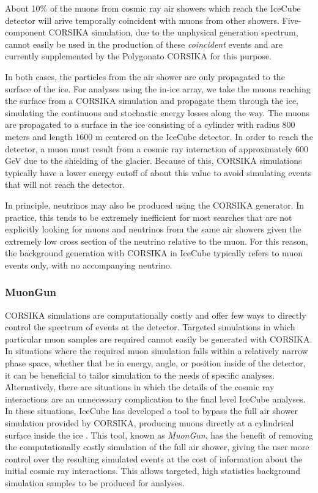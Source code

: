 About 10\% of the muons from cosmic ray air showers which reach the IceCube detector will arive temporally coincident with muons from other showers.
Five-component CORSIKA simulation, due to the unphysical generation spectrum, cannot easily be used in the production of these \emph{coincident} events and are currently supplemented by the Polygonato CORSIKA for this purpose.

In both cases, the particles from the air shower are only propagated to the surface of the ice. 
For analyses using the in-ice array, we take the muons reaching the surface from a CORSIKA simulation and propagate them through the ice, simulating the continuous and stochastic energy losses along the way. 
The muons are propagated to a surface in the ice consisting of a cylinder with radius 800 meters and length 1600 m centered on the IceCube detector.
In order to reach the detector, a muon must result from a cosmic ray interaction of approximately 600 GeV due to the shielding of the glacier.
Because of this, CORSIKA simulations typically have a lower energy cutoff of about this value to avoid simulating events that will not reach the detector.

In principle, neutrinos may also be produced using the CORSIKA generator. 
In practice, this tends to be extremely inefficient for most searches that are not explicitly looking for muons and neutrinos from the same air showers given the extremely low cross section of the neutrino relative to the muon.
For this reason, the background generation with CORSIKA in IceCube typically refers to muon events only, with no accompanying neutrino.

\subsubsection{MuonGun}
\label{subsubsec:muongun}
CORSIKA simulations are computationally costly and offer few ways to directly control the spectrum of events at the detector.
Targeted simulations in which particular muon samples are required cannot easily be generated with CORSIKA.
In situations where the required muon simulation falls within a relatively narrow phase space, whether that be in energy, angle, or position inside of the detector, it can be beneficial to tailor simulation to the needs of specific analyses.
Alternatively, there are situations in which the details of the cosmic ray interactions are an unnecessary complication to the final level IceCube analyses.
In these situations, IceCube has developed a tool to bypass the full air shower simulation provided by CORSIKA, producing muons directly at a cylindrical surface inside the ice \cite{Thesis-Jakob}.
This tool, known as \emph{MuonGun}, has the benefit of removing the computationally costly simulation of the full air shower, giving the user more control over the resulting simulated events at the cost of information about the initial cosmic ray interactions.
This allows targeted, high statistics background simulation samples to be produced for analyses.

